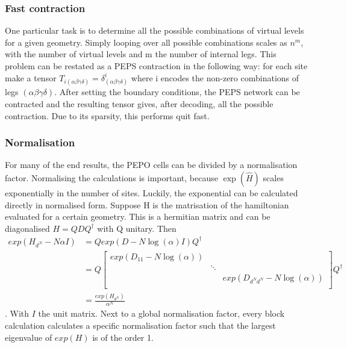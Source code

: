 \subsubsection{Fast contraction}

One particular task is to determine all the possible combinations of virtual levels for a given geometry. Simply looping over all possible combinations scales as $n^m$, with the number of virtual levels and m the number of internal legs. This problem can be restated as a PEPS contraction in the following way: for each site make a tensor $ T_{i (\alpha \beta \gamma \delta )} = \delta^i_{(\alpha \beta \gamma \delta )} $ where i encodes the non-zero combinations of legs $(\alpha \beta \gamma \delta)$. After setting the boundary conditions, the PEPS network can be contracted and the resulting tensor gives, after decoding, all the possible contraction. Due to its sparsity, this performs quit fast.


\subsubsection{Normalisation}

For many of the end results, the PEPO cells can be divided by a normalisation factor. Normalising the calculations is important, because $\exp( \hat{H})$ scales exponentially in the number of sites. Luckily, the exponential can be calculated directly in normalised form. Suppose H is the matrisation of the hamiltonian evaluated for a certain geometry. This is a hermitian matrix and can be diagonalised $H= Q D Q^{\dagger}$ with Q unitary. Then
\begin{align}
    exp(  H_{d^N} - N \alpha I  ) & =  Q exp(  D- N \log(\alpha ) I    ) Q^{\dagger} \\
                                  & =  Q \begin{bmatrix} exp(D_{1 1} - N \log(\alpha )) &        &                                     \\
                                               & \ddots &                                     \\
                                               &        & exp(D_{ d^N d^N} - N \log(\alpha )) \\
    \end{bmatrix}  Q^{\dagger}      \\
                                  & = \frac{  exp(  H_{d^N} ) }{ \alpha^N }
\end{align}.
With $I$ the unit matrix. Next to a global normalisation factor, every block calculation calculates a specific normalisation factor such that the largest eigenvalue of $exp(H)$ is of the order 1.


